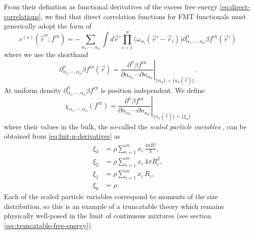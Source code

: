 From their definition as functional derivatives of the excess free energy \eqref{eq:direct-correlations}, we find that direct correlation functions for FMT functionals must generically adopt the form of \cite{RosenfeldPRL1989}
\begin{equation}\label{eq:fmt-direct-correlations}
  c^{(n)}(\vec{r}^n; f^\mathrm{ex})
  =
  - \sum_{\alpha_1, \cdots, \alpha_n}
  \int d\vec{r}'
  \prod_{i=1}^n \Big( \omega_{\alpha_i}(\vec{r}' - \vec{r}_i) \Big)
  \partial^n_{\alpha_1, \cdots, \alpha_n} \beta f^\mathrm{ex}(\vec{r}')
\end{equation}
where we use the shorthand 
\begin{equation*}
  \partial^n_{\alpha_1, \cdots, \alpha_n} \beta f^\mathrm{ex}(\vec{r}) =
  \left.
  \frac{\partial^n \beta f^\mathrm{ex}}{\partial n_{\alpha_1} \cdots \partial n_{\alpha_n}}
  \right|_{\{n_\alpha\} = \{n_\alpha(\vec{r})\}}.
\end{equation*}
At uniform density $\partial^n_{\alpha_1, \cdots, \alpha_n} \beta f^\mathrm{ex}$ is position independent.
We define
\begin{equation}
  \chi_{\alpha_1, \cdots, \alpha_n}(f^\mathrm{ex})
  =
  \left.
  \frac{\partial^n \beta f^\mathrm{ex}}{\partial n_{\alpha_1} \cdots \partial n_{\alpha_n}}
  \right|_{\{n_\alpha(\vec{r})\} = \{\xi_\alpha\}}
\end{equation}
where their values in the bulk, the so-called the \emph{scaled particle variables}%
,
can be obtained from \eqref{eq:fmt-n-derivatives} as \cite{LebowitzJCP1965}
\begin{subequations}\label{eq:spt-variables}
  \begin{align}
    \xi_3
    &=
    \rho \sum_{i=1}^m x_i \,
    \frac{4 \pi R_i^3}{3},
    \\
    \xi_2
    &=
    \rho \sum_{i=1}^m x_i \,
    4 \pi R_i^2,
    \\
    \xi_1
    &=
    \rho \sum_{i=1}^m x_i \,
    R_i,
    \\
    \xi_0
    &=
    \rho.
  \end{align}
\end{subequations}
Each of the scaled particle variables correspond to moments of the size distribution, so this is an example of a truncatable theory which remains physically well-posed in the limit of continuous mixtures (see section \ref{sec:truncatable-free-energy}).
